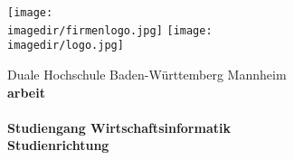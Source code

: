 \begin{titlepage}
\begin{minipage}{\textwidth}
		\vspace{-2cm}
		\noindent \texttt{[image: \\imagedir/firmenlogo.jpg]} \hfill \texttt{[image: \\imagedir/logo.jpg]}
\end{minipage}
\vspace{1em}
\begin{center}
	{\textsf{\large Duale Hochschule Baden-W\"urttemberg Mannheim}}\\[4em]
	{\textsf{\textbf{\large{\DieArtDerArbeit}arbeit}}}\\[6mm]
	{\textsf{\textbf{\Large{}\DerTitelDerArbeit}}} \\[1.5cm]
	{\textsf{\textbf{\large{}Studiengang Wirtschaftsinformatik}}\\[6mm]
	\textsf{\textbf{Studienrichtung \DieStudienrichtung}}}\vspace{10em}
	
\end{center}
\end{titlepage}